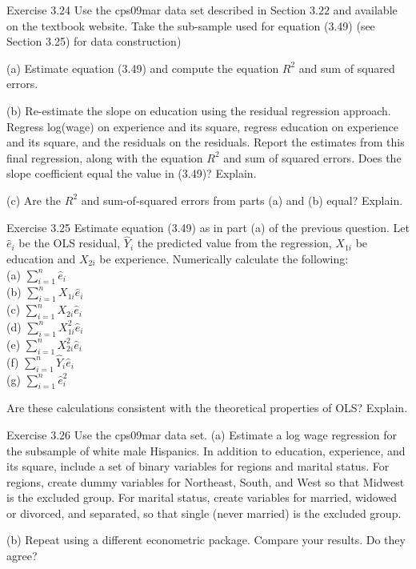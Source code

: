 \documentclass[10pt]{article}
\begin{document}
Exercise 3.24 Use the cps09mar data set described in Section $3.22$ and available on the textbook website. Take the sub-sample used for equation (3.49) (see Section 3.25) for data construction)

(a) Estimate equation (3.49) and compute the equation $R^{2}$ and sum of squared errors.

(b) Re-estimate the slope on education using the residual regression approach. Regress log(wage) on experience and its square, regress education on experience and its square, and the residuals on the residuals. Report the estimates from this final regression, along with the equation $R^{2}$ and sum of squared errors. Does the slope coefficient equal the value in (3.49)? Explain.

(c) Are the $R^{2}$ and sum-of-squared errors from parts (a) and (b) equal? Explain.

Exercise 3.25 Estimate equation (3.49) as in part (a) of the previous question. Let $\widehat{e}_{i}$ be the OLS residual, $\widehat{Y}_{i}$ the predicted value from the regression, $X_{1 i}$ be education and $X_{2 i}$ be experience. Numerically calculate the following:\\
(a) $\sum_{i=1}^{n} \widehat{e}_{i}$\\
(b) $\sum_{i=1}^{n} X_{1 i} \widehat{e}_{i}$\\
(c) $\sum_{i=1}^{n} X_{2 i} \widehat{e}_{i}$\\
(d) $\sum_{i=1}^{n} X_{1 i}^{2} \widehat{e}_{i}$\\
(e) $\sum_{i=1}^{n} X_{2 i}^{2} \widehat{e}_{i}$\\
(f) $\sum_{i=1}^{n} \widehat{Y}_{i} \widehat{e}_{i}$\\
(g) $\sum_{i=1}^{n} \widehat{e}_{i}^{2}$

Are these calculations consistent with the theoretical properties of OLS? Explain.

Exercise 3.26 Use the cps09mar data set. (a) Estimate a log wage regression for the subsample of white male Hispanics. In addition to education, experience, and its square, include a set of binary variables for regions and marital status. For regions, create dummy variables for Northeast, South, and West so that Midwest is the excluded group. For marital status, create variables for married, widowed or divorced, and separated, so that single (never married) is the excluded group.

(b) Repeat using a different econometric package. Compare your results. Do they agree?
\end{document}
